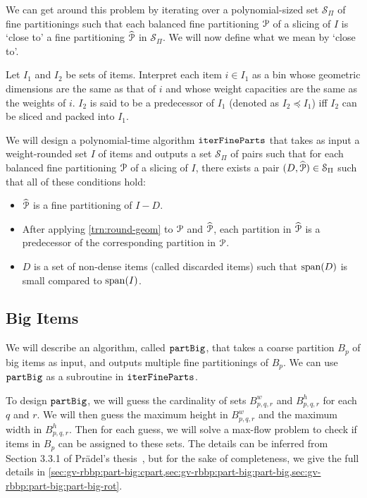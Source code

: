 We can get around this problem by iterating over a polynomial-sized set
$\mathcal{S}_{\Pi}$ of fine partitionings such that
each balanced fine partitioning $\mathcal{P}$ of a slicing of $I$ is `close to'
a fine partitioning $\widehat{\mathcal{P}}$ in $\mathcal{S}_{\Pi}$.
We will now define what we mean by `close to'.

\begin{definition}
Let $I_1$ and $I_2$ be sets of items. Interpret each item $i \in I_1$
as a bin whose geometric dimensions are the same as that of $i$
and whose weight capacities are the same as the weights of $i$.
$I_2$ is said to be a predecessor of $I_1$ (denoted as $I_2 \preceq I_1$)
iff $I_2$ can be sliced and packed into $I_1$.
\end{definition}

We will design a polynomial-time algorithm $\operatorname{\mathtt{iterFineParts}}$ that takes as input
a weight-rounded set $I$ of items and outputs a set $\mathcal{S}_{\Pi}$ of pairs such that
for each balanced fine partitioning $\mathcal{P}$ of a slicing of $I$,
there exists a pair
$(D, \widehat{\mathcal{P}}) \in \mathcal{S}_{\Pi}$ such that all of these conditions hold:
\begin{itemize}
\item $\widehat{\mathcal{P}}$ is a fine partitioning of $I-D$.
\item After applying \cref{trn:round-geom} to $\mathcal{P}$ and $\widehat{\mathcal{P}}$,
    each partition in $\widehat{\mathcal{P}}$ is a predecessor of the corresponding partition in $\mathcal{P}$.
\item $D$ is a set of non-dense items (called discarded items) such that $\operatorname{span}(D)$ is small
    compared to $\operatorname{span}(I)$.
\end{itemize}

\subsection{Big Items}

We will describe an algorithm, called $\operatorname{\mathtt{partBig}}$,
that takes a coarse partition $B_p$ of big items as input,
and outputs multiple fine partitionings of $B_p$.
We can use $\operatorname{\mathtt{partBig}}$ as a subroutine in $\operatorname{\mathtt{iterFineParts}}$.

To design $\operatorname{\mathtt{partBig}}$, we will guess the cardinality of sets $B^w_{p,q,r}$ and $B^h_{p,q,r}$
for each $q$ and $r$. We will then guess the maximum height in $B^w_{p,q,r}$
and the maximum width in $B^h_{p,q,r}$.
Then for each guess, we will solve a max-flow problem to check if items in $B_p$
can be assigned to these sets. The details can be inferred from
Section 3.3.1 of Pr\"adel's thesis~\cite{pradel-thesis},
but for the sake of completeness, we give the full details in
\cref{sec:gv-rbbp:part-big:cpart,sec:gv-rbbp:part-big:part-big,sec:gv-rbbp:part-big:part-big-rot}.

